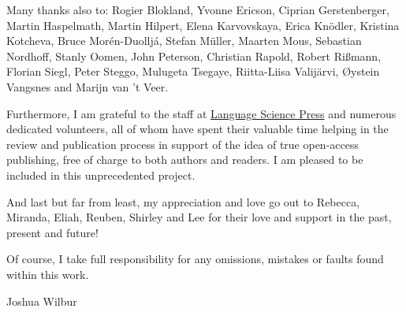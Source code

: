 \begin{sloppypar}
Many thanks also to:
Rogier Blokland, 
Yvonne Ericson, 
Ciprian Gerstenberger, 
Martin Haspelmath, 
Martin Hilpert, 
Elena Karvovskaya, 
Erica Knödler, 
Kristina Kotcheva, 
Bruce Morén-Duoll\-já, 
Stefan Müller, 
Maar\-ten Mous, 
Sebastian Nordhoff, 
Stanly Oomen, 
John Peterson, 
Christian Rapold, 
Robert Rißmann, 
Florian Siegl, 
Peter Steggo, 
Mulugeta Tsegaye, 
Riitta-Liisa Valijärvi, 
Øystein Vangs\-nes 
and 
Marijn van ’t Veer. 
\end{sloppypar}

Furthermore, I am grateful to the staff at \href{http://langsci-press.org/}{Language Science Press} and numerous dedicated volunteers, all of whom have spent their valuable time helping in the review and publication process in support of the idea of true open-access publishing, free of charge to both authors and readers. I am pleased to be included in this unprecedented project. 

And last but far from least, my appreciation and love go out to Rebecca, Miranda, Eliah, Reuben, Shirley and Lee for their love and support in the past, present and future!

Of course, I take full responsibility for any omissions, mistakes or faults found within this work. 

\hfill Joshua Wilbur

\hfill {}










%